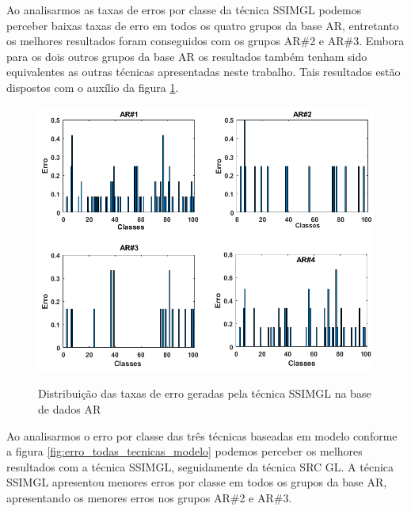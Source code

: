 Ao analisarmos as taxas de erros por classe da técnica SSIMGL podemos perceber baixas taxas de erro em todos os quatro grupos da base AR, entretanto os melhores resultados foram conseguidos com os grupos AR\#2 e AR\#3. Embora para os dois outros grupos da base AR os resultados também tenham sido equivalentes as outras técnicas apresentadas neste trabalho. Tais resultados estão dispostos com o auxílio da figura \ref{fig:taxa_erro_REC_SSIM}.


\begin{figure}[H]
\centering
\caption{Distribuição das taxas de erro geradas pela técnica SSIMGL na base de dados AR}
\includegraphics[scale=0.4]{imgs3/taxa_erro_REC_SSIM_AR.png}
\label{fig:taxa_erro_REC_SSIM}
\end{figure}


Ao analisarmos o erro por classe das três técnicas baseadas em modelo conforme a figura \ref{fig:erro_todas_tecnicas_modelo} podemos perceber os melhores resultados com a técnica SSIMGL, seguidamente da técnica SRC GL. A técnica SSIMGL apresentou menores erros por classe em todos os grupos da base AR, apresentando os menores erros nos grupos AR\#2 e AR\#3.

